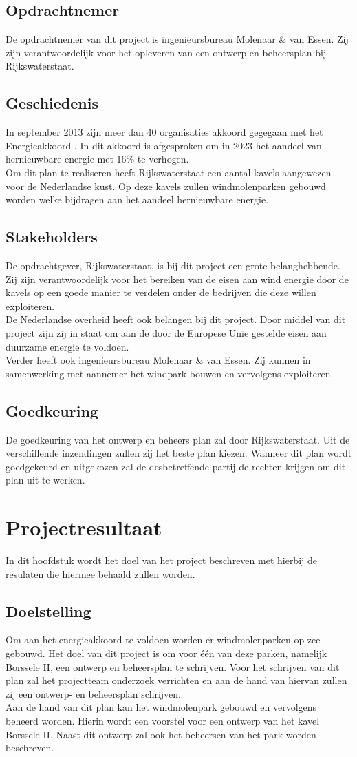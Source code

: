 \documentclass[numbers=endperiod]{scrartcl}
\newcommand{\sectionSmall}[1]{
	\vspace{-10pt}
	\section{#1}
	\vspace{-5pt}
}
\newcommand{\whitespace}{\vspace*{2 mm} \\}%
\begin{document}
	\subsection{Opdrachtnemer}
	De opdrachtnemer van dit project is ingenieursbureau Molenaar \& van Essen. Zij zijn verantwoordelijk voor het opleveren van een ontwerp en beheersplan bij Rijkswaterstaat.
	\subsection{Geschiedenis}
	In september 2013 zijn meer dan 40 organisaties akkoord gegegaan met het Energieakkoord \cite{SER:2013:Online}. In dit akkoord is afgesproken om in 2023 het aandeel van hernieuwbare energie met 16\% te verhogen.
	\whitespace
	Om dit plan te realiseren heeft Rijkswaterstaat een aantal kavels aangewezen voor de Nederlandse kust. Op deze kavels zullen windmolenparken gebouwd worden welke bijdragen aan het aandeel hernieuwbare energie.
	\subsection{Stakeholders}
	De opdrachtgever, Rijkswaterstaat, is bij dit project een grote belanghebbende. Zij zijn verantwoordelijk voor het bereiken van de eisen aan wind energie door de kavels op een goede manier te verdelen onder de bedrijven die deze willen exploiteren.
	\whitespace
	De Nederlandse overheid heeft ook belangen bij dit project. Door middel van dit project zijn zij in staat om aan de door de Europese Unie gestelde eisen aan duurzame energie te voldoen.
	\whitespace
	Verder heeft ook ingenieursbureau Molenaar \& van Essen. Zij kunnen in samenwerking met aannemer het windpark bouwen en vervolgens exploiteren.
	\subsection{Goedkeuring}
	De goedkeuring van het ontwerp en beheers plan zal door Rijkswaterstaat. Uit de verschillende inzendingen zullen zij het beste plan kiezen. Wanneer dit plan wordt goedgekeurd en uitgekozen zal de desbetreffende partij de rechten krijgen om dit plan uit te werken.
	\newpage
	
	\sectionSmall{Projectresultaat}
	In dit hoofdstuk wordt het doel van het project beschreven met hierbij de resulaten die hiermee behaald zullen worden.
	
	\subsection{Doelstelling}
	Om aan het energieakkoord te voldoen worden er windmolenparken op zee gebouwd. Het doel van dit project is om voor één van deze parken, namelijk Borssele II, een ontwerp en beheersplan te schrijven. Voor het schrijven van dit plan zal het projectteam onderzoek verrichten en aan de hand van hiervan zullen zij een ontwerp- en beheersplan schrijven.
	\whitespace
	Aan de hand van dit plan kan het windmolenpark gebouwd en vervolgens beheerd worden. Hierin wordt een voorstel voor een ontwerp van het kavel Borssele II. Naast dit ontwerp zal ook het beheersen van het park worden beschreven.
	
\end{document}
